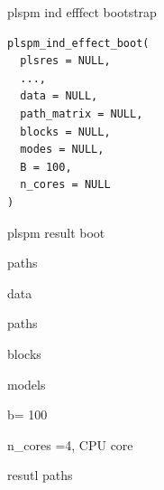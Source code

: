 \documentclass[a4paper]{book}
\begin{document}
%
\begin{Description}
plspm ind efffect bootstrap
\end{Description}
%
\begin{Usage}
\begin{verbatim}
plspm_ind_effect_boot(
  plsres = NULL,
  ...,
  data = NULL,
  path_matrix = NULL,
  blocks = NULL,
  modes = NULL,
  B = 100,
  n_cores = NULL
)
\end{verbatim}
\end{Usage}
%
\begin{Arguments}
\begin{ldescription}
\item[\code{plsres}] plspm result boot

\item[\code{...}] paths

\item[\code{data}] data

\item[\code{path\_matrix}] paths

\item[\code{blocks}] blocks

\item[\code{modes}] models

\item[\code{B}] b= 100

\item[\code{n\_cores}] n\_cores =4, CPU core
\end{ldescription}
\end{Arguments}
%
\begin{Value}
resutl paths
\end{Value}
%
\end{document}
